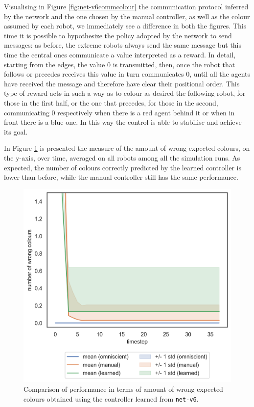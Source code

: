 Visualising in Figure \ref{fig:net-v6commcolour} the communication protocol 
inferred by the network and the one chosen by the manual controller, as well as 
the colour assumed by each robot, we immediately see a difference in both the 
figures.
This time it is possible to hypothesize the policy adopted by the network to send 
messages: as before, the extreme robots always send the same message but this 
time the central ones communicate a value interpreted as a reward. In detail, 
starting from the edges, the value 0 is transmitted, then, once the robot that 
follows or precedes receives this value in turn communicates 0, until all the agents 
have received the message and therefore have clear their positional order.
This type of reward acts in such a way as to colour as desired the following robot, 
for those in the first half, or the one that precedes, for those in the second, 
communicating 0 respectively when there is a red agent behind it or when in front 
there is a blue one. In this way the control is able to stabilise and achieve its goal.

In Figure \ref{fig:net-v6error} is presented the measure of the amount of wrong 
expected colours, on the y-axis, over time, averaged on all robots among all the 
simulation runs. 
As expected, the number of colours correctly predicted by the learned controller 
is lower than before, while the manual controller still has the same performance.  
\begin{figure}[!htb]
	\centering
	\includegraphics[width=.5\textwidth]{contents/images/net-v6/colours-errors-compressed}%
	\caption[Evaluation of \texttt{net-v6} amount of wrong expected 
	colours.]{Comparison of performance in terms of amount of wrong expected 
		colours obtained using the controller learned from \texttt{net-v6}.}
	\label{fig:net-v6error}
\end{figure}

